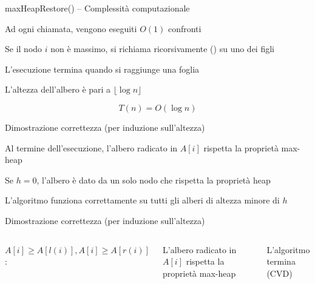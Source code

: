 \begin{frame}{\textsf{maxHeapRestore}() -- Complessità computazionale}

\vspace{-9pt}

\BI
\item Ad ogni chiamata, vengono eseguiti $O(1)$ confronti
\item Se il nodo $i$ non è massimo, si richiama ricorsivamente
\maxheapify() su uno dei figli 
\item L'esecuzione termina quando si raggiunge una foglia
\item L'altezza dell'albero è pari a $\lfloor \log n \rfloor$
\EI

\bigskip
{}
\[
  T(n) = O(\log n)
\]

\end{frame}

\begin{frame}{Dimostrazione correttezza (per induzione sull'altezza)}

\vspace{-9pt}
\begin{myboxtitle}[Teorema]
Al termine dell'esecuzione, l'albero radicato in $A[i]$
rispetta la proprietà max-heap
\end{myboxtitle}

\pause
\begin{myboxtitle}[Caso base: altezza $h=0$]
Se $h=0$, l'albero è dato da un solo nodo che rispetta la
proprietà heap
\end{myboxtitle}

\begin{myboxtitle}
L'algoritmo funziona correttamente su tutti gli alberi di altezza minore di $h$
\end{myboxtitle}

\end{frame}

\begin{frame}{Dimostrazione correttezza (per induzione sull'altezza)}

\vspace{-12pt}
\begin{columns}[T]

\medskip
$A[i] \geq A[l(i)], A[i] \geq A[r(i)]$:
  \BI
  \item L'albero radicato in $A[i]$ rispetta la proprietà max-heap 
  \item L'algoritmo termina (CVD)
  \EI
{}

\vspace{-6pt}
\end{columns}
\end{frame}

